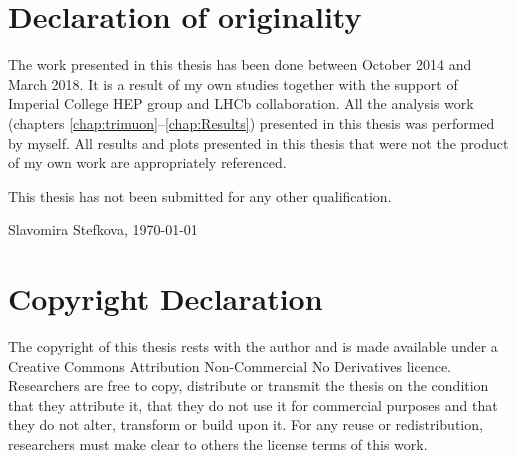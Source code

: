 \chapter*{Declaration of originality}
The work presented in this thesis has been done between October 2014 and March 2018. It is a result of my own studies together with the support of Imperial College HEP group and LHCb collaboration. All the analysis work (chapters \ref{chap:trimuon}--\ref{chap:Results}) presented in this thesis was performed by myself. All results and plots presented in this thesis that were not the product of my own work are appropriately referenced. %

\vspace{1cm}
This thesis has not been submitted for any other qualification.

\vspace{1cm}



Slavomira Stefkova, \vspace{1cm} \today


\vspace{5cm}

\clearpage
{}
{}
\chapter*{Copyright Declaration}
The copyright of this thesis rests with the author and is made available under a Creative Commons Attribution Non-Commercial No Derivatives licence. Researchers are free to copy, distribute or transmit the thesis on the condition that they attribute it, that they do not use it for commercial purposes and that they do not alter, transform or build upon it. For any reuse or redistribution, researchers must make clear to others the license terms of this work.

